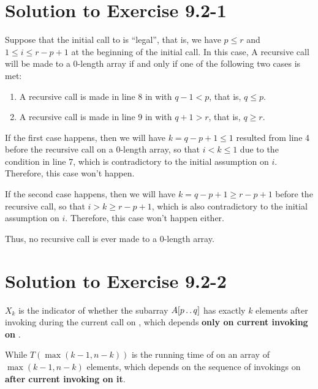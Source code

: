 \documentclass[a4paper, fleqn]{article}
\begin{document}
\section*{Solution to Exercise 9.2-1}

Suppose that the initial call to  is
``legal'', that is, we have $p \leq r$ and $1 \leq i \leq r-p+1$ at
the beginning of the initial call. In this case, A recursive call will
be made to a 0-length array if and only if one of the following two
cases is met:
\begin{enumerate}
\item
A recursive call is made in line 8 in  with
$q-1 < p$, that is, $q \leq p$.
\item
A recursive call is made in line 9 in  with
$q+1 > r$, that is, $q \geq r$.
\end{enumerate}
If the first case happens, then we will have $k = q-p+1 \leq 1$
resulted from line 4 before the recursive call on a 0-length array, so
that $i < k \leq 1$ due to the  condition in line 7, which is
contradictory to the initial assumption on $i$. Therefore, this case
won't happen.

If the second case happens, then we will have $k = q-p+1 \geq r-p+1$
before the recursive call, so that $i > k \geq r-p+1$, which is also
contradictory to the initial assumption on $i$. Therefore, this case
won't happen either.

Thus, no recursive call is ever made to a 0-length array.





\section*{Solution to Exercise 9.2-2}

$X_k$ is the indicator of whether the subarray $A[p \mathinner{\ldotp\ldotp} q]$ has
exactly $k$ elements after invoking  during
the current call on , which depends
\textbf{only on current invoking on }.

While $T(\max(k-1, n-k))$ is the running time of
 on an array of $\max(k-1, n-k)$ elements,
which depends on the sequence of invokings on
 \textbf{after current invoking on it}.
\end{document}
